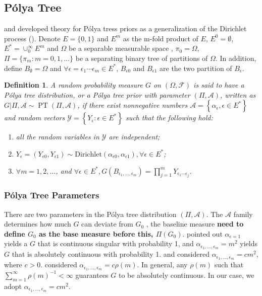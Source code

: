 \documentclass[12pt]{article}
\newtheorem{deff}[thm]{Definition}
\newcommand{\polya}{P\'{o}lya}
\DeclareMathOperator{\pt}{PT}
\begin{document}
\subsection{\polya{} Tree}
\citet{lavine1992, lavine1994} and \citet{mauldin1992} developed theory for
\polya{} tress priors as a generalization of the Dirichlet
process (\citet{ferguson1974}). Denote $E=\{0,1\}$ and $E^m$ as the m-fold
product of $E$, $E^0= \emptyset$, $E^{*} = \cup_0^{\infty} E^m$ and $\Omega$ be a separable
measurable space , $\pi_0 = \Omega$, $\Pi= \{ \pi_m: m=0,1, \ldots \}
$ be a separating binary tree of partitions of $\Omega$. In addition,
define $B_{\emptyset} = \Omega$ and $\forall \epsilon=\epsilon_1\cdots
\epsilon_m \in E^{*}$, $B_{\epsilon 0}$ and $B_{\epsilon 1}$ are the
two partition of $B_{\epsilon}$.  
\begin{deff}
  A random probability measure $G$ on $(\Omega, \mathcal{F})$ is said to
  have a \polya{} tree distribution, or a \polya{} tree prior with
  parameter $(\Pi, \mathcal{A})$, written as $G|\Pi, \mathcal{A} \sim
  \pt (\Pi, \mathcal{A})$, if there exist nonnegative numbers
  $\mathcal{A}= \left\{ \alpha_{\epsilon}, \epsilon \in E^{*} \right\}$
  and random vectors $\mathcal{Y} = \left\{ Y_{\epsilon} : \epsilon \in
    E^{*} \right\}$ such that the following hold:
  \begin{enumerate}
  \item\label{item:1} all the random variables in $\mathcal{Y}$ are independent;
  \item $Y_{\epsilon}= (Y_{\epsilon 0} , Y_{\epsilon 1}) \sim
    \mathrm{Dirichlet}(\alpha_{\epsilon 0 }, \alpha_{\epsilon 1}),
    \forall \epsilon \in E^{*}$;
  \item $\forall m=1,2, \ldots$, and $\forall \epsilon \in E^{*},
    G(B_{\epsilon_{1}, \ldots, \epsilon_m}) = \prod_{j=1}^m Y_{\epsilon_1
      \cdots \epsilon_j}$.
  \end{enumerate} 
\end{deff}

\subsubsection{\polya{} Tree Parameters}
There are two parameters in the \polya{} tree distribution $(\Pi,
\mathcal{A})$. The $\mathcal{A}$ family determines how much $G$ can
deviate from $G_0$ , the baseline measure {\bf need to define $G_0$ as
  the base measure before this, $\Pi(G_0)$}. \citet{ferguson1974} pointed out
$\alpha_{\epsilon = 1} $ yields a $G$ that is continuous singular with
probability 1, and $\alpha_{\epsilon_1, \ldots, \epsilon_m} = m^2$
yields $G$ that is absolutely continuous with probability 1. \citet{walker1999}
and \citet{paddock1999} considered $\alpha_{\epsilon_1,
  \ldots, \epsilon_m} = cm^2$, where $c > 0$. \citet{berger2001}
considered $\alpha_{\epsilon_1, \ldots, \epsilon_m} = c 
\rho(m)$. In general, any $\rho(m) $ such that $\sum_{m=1}^{\infty}
\rho(m)^{-1} < \infty$ guarantees $G$ to be absolutely continuous. In
our case, we adopt $\alpha_{\epsilon_1, \ldots, \epsilon_m} = cm^2$.
\end{document}
